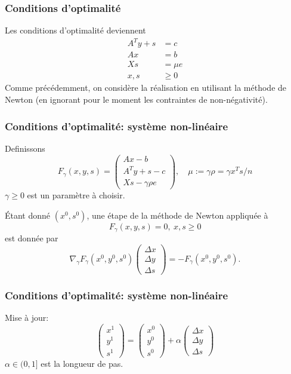 \documentclass[usepdftitle=false]{beamer}
\begin{document}
\begin{frame}
\frametitle{Conditions d'optimalité}

Les conditions d'optimalité deviennent
\begin{align*}
A^Ty + s &= c \\
Ax &= b \\
Xs &= \mu e \\
x, s &\geq 0
\end{align*}
Comme précédemment, on considère la réalisation en utilisant la méthode de Newton (en ignorant pour le moment les contraintes de non-négativité).

\end{frame}

\begin{frame}
\frametitle{Conditions d'optimalité: système non-linéaire}

Definissons
$$
F_{\gamma} (x,y,s) =
\begin{pmatrix}
Ax-b \\
A^Ty + s - c \\
Xs - \gamma \rho e
\end{pmatrix},
\quad
\mu := \gamma \rho = \gamma x^Ts/n
$$
$\gamma \geq 0$ est un paramètre à choisir.

\mbox{}

Étant donné $(x^0, s^0)$, une étape de la méthode de Newton appliquée à
$$
F_{\gamma} (x,y,s) = 0,\ x,s\geq 0
$$
est donnée par
$$
\nabla_{\gamma} F_{\gamma} (x^0,y^0,s^0)
\begin{pmatrix}
\Delta x \\ \Delta y \\ \Delta s
\end{pmatrix}
= - F_{\gamma} (x^0,y^0,s^0).
$$

\end{frame}

\begin{frame}
\frametitle{Conditions d'optimalité: système non-linéaire}

Mise à jour:
$$
\begin{pmatrix} x^1 \\ y^1 \\ s^1 \end{pmatrix}
=
\begin{pmatrix} x^0 \\ y^0 \\ s^0 \end{pmatrix}
+\alpha
\begin{pmatrix}
\Delta x \\ \Delta y \\ \Delta s
\end{pmatrix}
$$
$\alpha \in (0,1]$ est la longueur de pas.

\end{frame}
\end{document}
